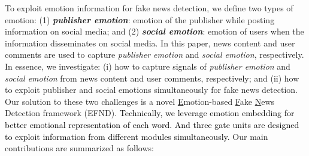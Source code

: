 \documentclass[conference]{IEEEtran}
\newcommand{\m}{EFND}
\newcommand{\new}[1]{\textcolor{black}{{#1}}}
\begin{document}
	To exploit emotion information for fake news detection, we define two types of emotion: (1) \textbf{{\em publisher emotion}}: emotion of the publisher while posting information on social media; and (2) \textbf{{\em social emotion}}: emotion of users when the information disseminates on social media. 
	In this paper, news content and user comments are used to capture {\em publisher emotion} and {\em social emotion}, respectively.  
	In essence, we investigate: (i) how to capture signals of {\em publisher emotion} and {\em social emotion} from news content and user comments, respectively; and (ii) how to exploit publisher and social emotions simultaneously for fake news detection. Our solution to these two challenges is a novel \underline{E}motion-based \underline{F}ake \underline{N}ews Detection framework ({\m}). \new{Technically, we leverage emotion embedding for better emotional representation of each word. And three gate units are designed to exploit information from different modules simultaneously.} Our main contributions are summarized as follows:
	
	
\end{document}
